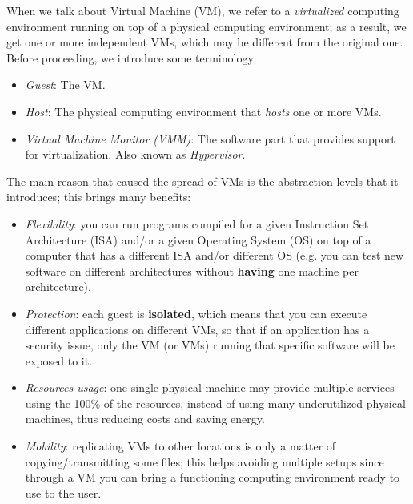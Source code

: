 \documentclass[a4paper, 12pt, titlepage]{report}
\begin{document}
When we talk about Virtual Machine (VM), we refer to a \textit{virtualized} computing environment running on top of a physical computing environment; as a result, we get one or more independent VMs, which may be different from the original one.\newline
Before proceeding, we introduce some terminology:
\begin{itemize}
\item \textit{Guest}: The VM.
\item \textit{Host}: The physical computing environment that \textit{hosts} one or more VMs.
\item \textit{Virtual Machine Monitor (VMM)}: The software part that provides support for virtualization. Also known as \textit{Hypervisor}.
\end{itemize}

The main reason that caused the spread of VMs is the abstraction levels that it introduces; this brings many benefits:
\begin{itemize}
\item \textit{Flexibility}: you can run programs compiled for a given Instruction Set Architecture (ISA) and/or a given Operating System (OS) on top of a computer that has a different ISA and/or different OS (e.g. you can test new software on different architectures without \textbf{having} one machine per architecture).
\item \textit{Protection}: each guest is \textbf{isolated}, which means that you can execute different applications on different VMs, so that if an application has a security issue, only the VM (or VMs) running that specific software will be exposed to it.
\item \textit{Resources usage}: one single physical machine may provide multiple services using the 100\% of the resources, instead of using many underutilized physical machines, thus reducing costs and saving energy.
\item \textit{Mobility}: replicating VMs to other locations is only a matter of copying/transmitting some files; this helps avoiding multiple setups since through a VM you can bring a functioning computing environment ready to use to the user.
\end{itemize}
\end{document}
